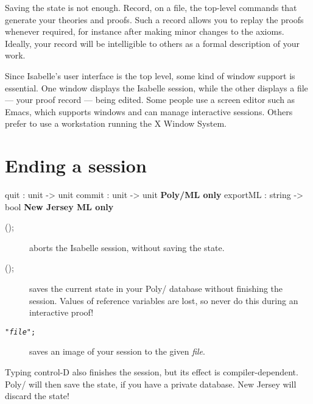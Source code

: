 Saving the state is not enough.  Record, on a file, the top-level commands
that generate your theories and proofs.  Such a record allows you to replay
the proofs whenever required, for instance after making minor changes to
the axioms.  Ideally, your record will be intelligible to others as a
formal description of your work.

Since Isabelle's user interface is the \ML{} top level, some kind of window
support is essential.  One window displays the Isabelle session, while the
other displays a file --- your proof record --- being edited.  Some people
use a screen editor such as Emacs, which supports windows and can manage
interactive sessions.  Others prefer to use a workstation running the X Window
System.


\section{Ending a session}
\begin{ttbox} 
quit     : unit -> unit
commit   : unit -> unit \hfill{\bf Poly/ML only}
exportML : string -> bool \hfill{\bf New Jersey ML only}
\end{ttbox}
\begin{description}
\item[();]  
aborts the Isabelle session, without saving the state.

\item[();]  saves the current state in your
Poly/\ML{} database without finishing the session.  Values of reference
variables are lost, so never do this during an interactive proof!

\item[ \tt"{\it file}";]  saves an
image of your session to the given {\it file}.
\end{description}

\begin{warn}
Typing control-D also finishes the session, but its effect is
compiler-dependent.  Poly/\ML{} will then save the state, if you have a
private database.  New Jersey \ML{} will discard the state!
\end{warn}


